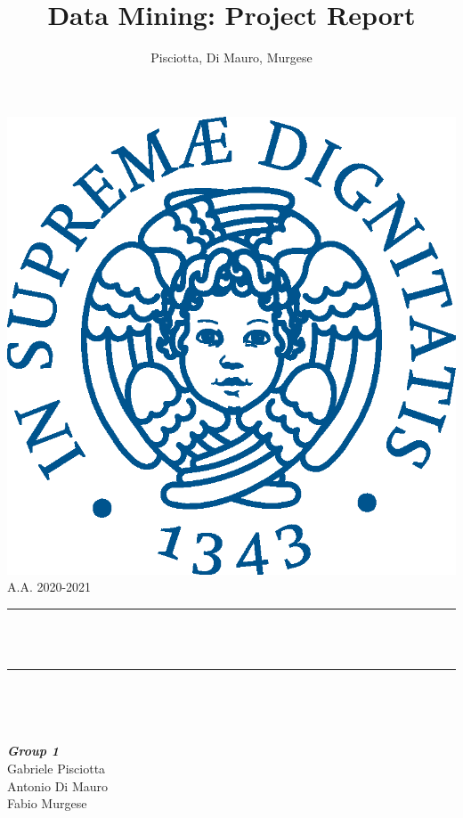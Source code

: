 \documentclass[12pt]{article}
\title{Data Mining: Project Report}								%
\author{Pisciotta, Di Mauro, Murgese}								%
\makeatletter
\let\thetitle\@title
\makeatother
\begin{document}

\begin{titlepage}
	\centering
    \vspace*{0.5 cm}
    \includegraphics[scale = 0.5]{logo.eps}\\[2.0 cm]	%

	\textsc{\Large A.A. 2020-2021}\\[0.5 cm]				%
	\rule{\linewidth}{0.2 mm} \\[0.4 cm]
	{ \huge \bfseries \thetitle}\\
	\rule{\linewidth}{0.2 mm} \\[5 cm]
	
	
	\begin{minipage}{0.5\textwidth}
		\begin{flushleft} \large
			
		\end{flushleft}
			\end{minipage}~
			\begin{minipage}{0.5\textwidth}
            
			\begin{flushright} \large
			\emph{\textbf{Group 1}} \\
			Gabriele Pisciotta \\
            Antonio Di Mauro \\
            Fabio Murgese \\
		\end{flushright}
        
	\end{minipage}\\[2 cm]
	
	

    
    
	
\end{titlepage}
\end{document}
